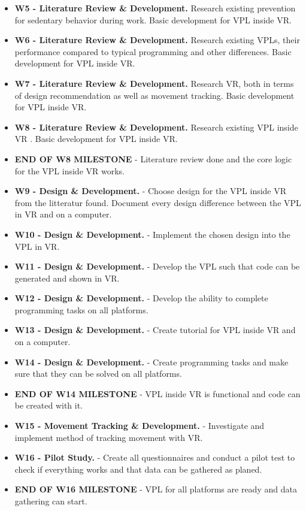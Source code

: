 \documentclass{sigchi}
\begin{document}
\begin{itemize}
  \item \textbf{W5 - Literature Review \& Development.} Research existing prevention for sedentary behavior during work. Basic development for VPL inside VR.
  \item \textbf{W6 - Literature Review \& Development.} Research existing VPLs, their performance compared to typical programming and other differences. Basic development for VPL inside VR.
  \item \textbf{W7 - Literature Review \& Development.} Research VR, both in terms of design recommendation as well as movement tracking. Basic development for VPL inside VR.
  \item \textbf{W8 - Literature Review \& Development.} Research existing VPL inside VR . Basic development for VPL inside VR.
  \item \textbf{ END OF W8 MILESTONE  } - Literature review done and the core logic for the VPL inside VR works.
  \item \textbf{W9 - Design \& Development.} - Choose design for the VPL inside VR from the litteratur found. Document every design difference between the VPL in VR and on a computer.
  \item \textbf{W10 - Design \& Development.} - Implement the chosen design into the VPL in VR.
  \item \textbf{W11 - Design \& Development.} - Develop the VPL such that code can be generated and shown in VR. 
  \item \textbf{W12 - Design \& Development.} - Develop the ability to complete programming tasks on all platforms.
  \item \textbf{W13 - Design \& Development.} - Create tutorial for VPL inside VR and on a computer.
  \item \textbf{W14 - Design \& Development.} - Create programming tasks and make sure that they can be solved on all platforms.
  \item \textbf{ END OF W14 MILESTONE  } - VPL inside VR is functional and code can be created with it.
  \item \textbf{W15 - Movement Tracking \& Development.} - Investigate and implement method of tracking movement with VR.
  \item \textbf{W16 - Pilot Study.} - Create all questionnaires and conduct a pilot test to check if everything works and that data can be gathered as planed.
  \item \textbf{ END OF W16 MILESTONE  } - VPL for all platforms are ready and data gathering can start.

\end{itemize}
\end{document}
